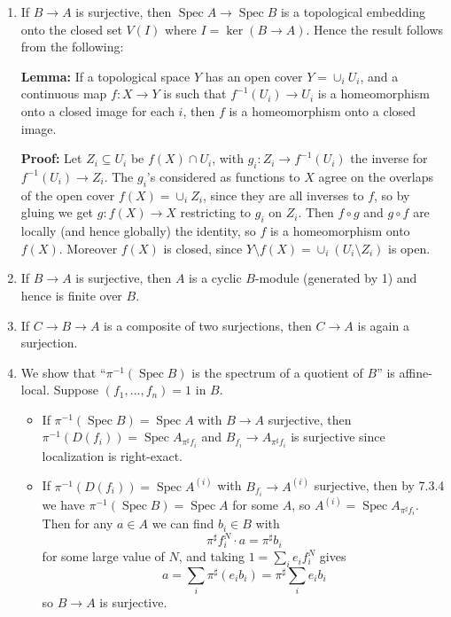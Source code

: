 \documentclass{report}
\DeclareMathOperator{\Spec}{Spec}
\begin{document}
\begin{enumerate}[label=\textbf{8.1.\Alph*.}]
	\item If $B\to A$ is surjective, then $\Spec A\to\Spec B$ is a topological
	      embedding onto the closed set $V(I)$ where $I=\ker(B\to A)$. Hence the
	      result follows from the following:

	      \textbf{Lemma:} If a topological space $Y$ has an open cover
	      $Y=\cup_iU_i$, and a continuous map $f:X\to Y$ is such that
	      $f^{-1}(U_i)\to U_i$ is a homeomorphism onto a closed image for each
	      $i$, then $f$ is a homeomorphism onto a closed image.

	      \textbf{Proof:} Let $Z_i\subseteq U_i$ be $f(X)\cap U_i$, with
	      $g_i:Z_i\to f^{-1}(U_i)$ the inverse for $f^{-1}(U_i)\to Z_i$. The
	      $g_i$'s considered as functions to $X$ agree on the overlaps of the open
	      cover $f(X)=\cup_iZ_i$, since they are all inverses to $f$, so by gluing
	      we get $g:f(X)\to X$ restricting to $g_i$ on $Z_i$. Then $f\circ g$ and
	      $g\circ f$ are locally (and hence globally) the identity, so $f$ is a
	      homeomorphism onto $f(X)$. Moreover $f(X)$ is closed, since
	      $Y\setminus f(X)=\cup_i(U_i\setminus Z_i)$ is open.

	\item If $B\to A$ is surjective, then $A$ is a cyclic $B$-module (generated
	      by 1) and hence is finite over $B$.

	\item If $C\to B\to A$ is a composite of two surjections, then $C\to A$ is
	      again a surjection.

	\item We show that ``$\pi^{-1}(\Spec B)$ is the spectrum of a quotient of
	      $B$'' is affine-local. Suppose $(f_1,\ldots,f_n)=1$ in $B$.
	      \begin{itemize}
		      \item If $\pi^{-1}(\Spec B)=\Spec A$ with $B\to A$ surjective, then
		            $\pi^{-1}(D(f_i))=\Spec A_{\pi^\sharp f_i}$ and
		            $B_{f_i}\to A_{\pi^\sharp f_i}$ is surjective since localization
		            is right-exact.

		      \item If $\pi^{-1}(D(f_i))=\Spec A^{(i)}$ with $B_{f_i}\to A^{(i)}$
		            surjective, then by 7.3.4 we have $\pi^{-1}(\Spec B)=\Spec A$
		            for some $A$, so $A^{(i)}=\Spec A_{\pi^\sharp f_i}$. Then for
		            any $a\in A$ we can find $b_i\in B$ with
		            \begin{equation*}
			            \pi^\sharp f_i^N\cdot a = \pi^\sharp b_i
		            \end{equation*}
		            for some large value of $N$, and taking $1=\sum_ie_if_i^N$ gives
		            \begin{equation*}
			            a = \sum_i\pi^\sharp(e_ib_i) = \pi^\sharp\sum_ie_ib_i
		            \end{equation*}
		            so $B\to A$ is surjective.
	      \end{itemize}


\end{enumerate}
\end{document}
